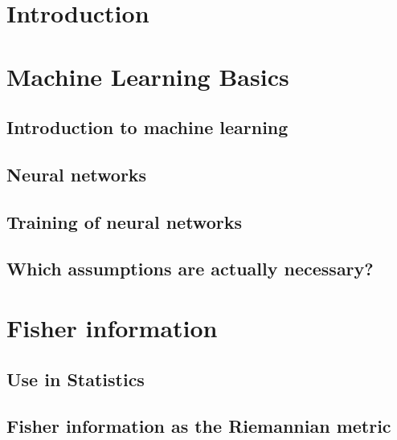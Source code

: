 \documentclass[12pt, twoside, a4paper]{report}
\begin{document}
	
	\tableofcontents
	\thispagestyle{plain}
	

	\chapter{Introduction}
	
	
	\chapter{Machine Learning Basics}\label{sec:ChapterMachineLearningBasics}
	\section{Introduction to machine learning}\label{sec:MachineLearningIntroduction}
	
	\section{Neural networks}\label{sec:NeuralNetworks(BigSection)}
	
	\section{Training of neural networks}\label{sec:NeuralNetworkTraining}
	
	\section{Which assumptions are actually necessary?}\label{sec:WhichAssumptionsAreNecessary}
	
	
	
	\chapter{Fisher information}\label{sec:ChapterFisherInformation}
	
	\section{Use in Statistics}\label{sec:FIinStatistics}
	
	\section{Fisher information as the Riemannian metric}\label{sec:FisherInformationAsRiemannianMetric(BigChapter)}
	
\end{document}
